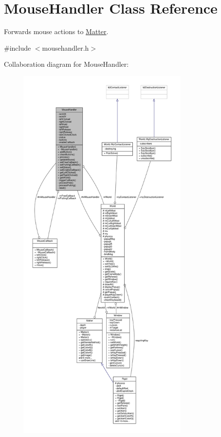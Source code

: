 \hypertarget{classMouseHandler}{}\section{Mouse\+Handler Class Reference}
\label{classMouseHandler}


Forwards mouse actions to \hyperlink{classMatter}{Matter}.  




{\ttfamily \#include $<$mousehandler.\+h$>$}



Collaboration diagram for Mouse\+Handler\+:
\nopagebreak
\begin{figure}[H]
\begin{center}
\leavevmode
\includegraphics[height=550pt]{classMouseHandler__coll__graph}
\end{center}
\end{figure}
